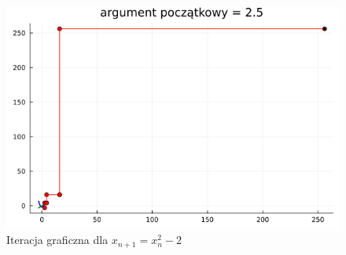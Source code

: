 \documentclass{article}
\begin{document}
\begin{figure}[h!]
    \includegraphics[scale=0.39]{plots/x^2-2:2.5.png}
    \caption{Iteracja graficzna dla $x_{n+1} = x_n^2 - 2$}
\end{figure}
\end{document}
